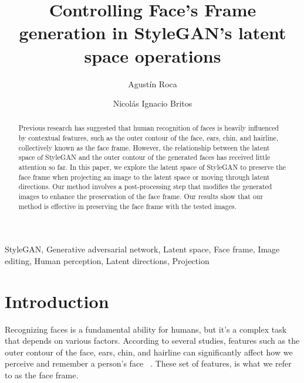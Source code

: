 \documentclass[review]{elsarticle}
\begin{document}
\begin{frontmatter}

\title{Controlling Face's Frame generation in StyleGAN's latent space operations}

\author[1]{Agustín Roca}

\author[1]{Nicolás Ignacio Britos}



\begin{abstract}

Previous research has suggested that human recognition of faces is heavily influenced by contextual features, such as the outer contour of the face, ears, chin, and hairline, collectively known as the face frame. However, the relationship between the latent space of StyleGAN and the outer contour of the generated faces has received little attention so far. In this paper, we explore the latent space of StyleGAN to preserve the face frame when projecting an image to the latent space or moving through latent directions. Our method involves a post-processing step that modifies the generated images to enhance the preservation of the face frame. Our results show that our method is effective in preserving the face frame with the tested images.

\end{abstract}

\begin{keyword}
StyleGAN, Generative adversarial network, Latent space, Face frame, Image editing, Human perception, Latent directions, Projection
\end{keyword}

\end{frontmatter}

\linenumbers 

\section{Introduction}

Recognizing faces is a fundamental ability for humans, but it's a complex task that depends on various factors. According to several studies, features such as the outer contour of the face, ears, chin, and hairline can significantly affect how we perceive and remember a person's face~\cite{want2003} %
. These set of features, is what we refer to as the face frame. 
\end{document}
